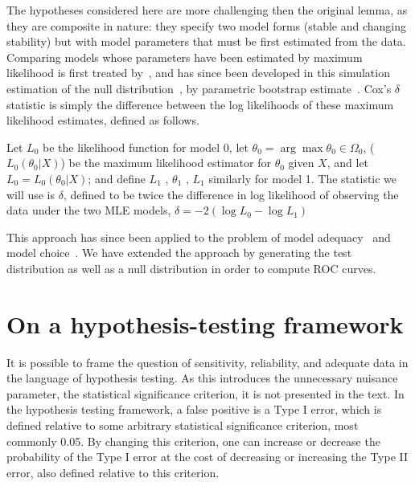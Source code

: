 \documentclass[authoryear, preprint,review,12pt]{elsarticle}
\begin{document}
The hypotheses considered here are more challenging then the original lemma, as they are composite in nature:
they specify two model forms (stable and changing stability)
but with model parameters that must be first estimated from the data.
Comparing models whose parameters have been estimated by maximum likelihood is first treated by~\citet{Cox1961, Cox1962},
and has since been developed in this simulation estimation of the null distribution~\citep{McLachlan1987}, by parametric bootstrap estimate~\citep{Efron1987}.  
Cox's $\delta$ statistic is simply the difference between the log likelihoods of these maximum likelihood estimates, defined as follows.

Let $L_0$ be the likelihood function for model 0, let $\theta_0 = \arg \max \theta_0 \in \Omega_0$, ($L_0 (\theta_0 |X)$) be the maximum likelihood estimator for $\theta_0$ given $X$, and let $L_0 = L_0 (\theta_0 |X)$; and define $L_1$ , $\theta_1$ , $L_1$ similarly for model 1. The statistic we will use is $\delta$, defined to be twice the difference in log likelihood of observing the data under the two MLE models,
$\delta = -2 (\log L_0 - \log L_1 )$

This approach has since been applied to the problem of model adequacy~\citep{Goldman1993} and model choice~\citep{Huelsenbeck1996}.  
We have extended the approach by generating the test distribution as well as a null distribution in order to compute ROC curves.  




\section{On a hypothesis-testing framework}
It is possible to frame the question of sensitivity, reliability, and adequate data in the language of hypothesis testing. As this introduces the unnecessary nuisance parameter, the statistical significance criterion, it is not presented in the text.  In the hypothesis testing framework, a false positive is a Type I error, which is defined relative to some arbitrary statistical significance criterion, most commonly 0.05.  By changing this criterion, one can increase or decrease the probability of the Type I error at the cost of decreasing or increasing the Type II error, also defined relative to this criterion.  
\end{document}
